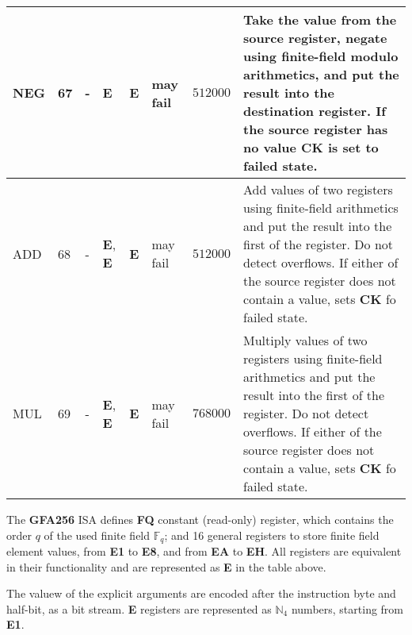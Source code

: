 \documentclass[9pt,oneside]{amsart}
\begin{document}
\begin{table}[h]
\begin{tabular}{l p{1cm} p{1.4cm} p{1cm} p{1cm} p{1.5cm} r p{6cm}}
NEG	&	67	&	-	&	\textbf{E}	&	\textbf{E}	&	may fail	&$512000$	&Take the value from the source register, negate using finite-field modulo arithmetics, and put the result into the destination register. If the source register has no value \textbf{CK} is set to failed state.	\\ \midrule
ADD	&	68	&	-	&	\textbf{E}, \textbf{E}	&	\textbf{E}	&	may fail	&$512000$	&Add values of two registers using finite-field arithmetics and put the result into the first of the register. Do not detect overflows. If either of the source register does not contain a value, sets \textbf{CK} fo failed state.	\\ \midrule
MUL	&	69	&	-	&	\textbf{E}, \textbf{E}	&	\textbf{E}	&	may fail	&$768000$	&Multiply values of two registers using finite-field arithmetics and put the result into the first of the register. Do not detect overflows. If either of the source register does not contain a value, sets \textbf{CK} fo failed state.	\\
\bottomrule
\end{tabular}
\end{table}


The \textbf{GFA256} ISA defines \textbf{FQ} constant (read-only) register,
which contains the order $q$ of the used finite field $\mathbb{F}_q$; and 
16 general registers to store finite field element values,
from \textbf{E1} to \textbf{E8}, and from \textbf{EA} to \textbf{EH}.
All registers are equivalent in their functionality and are represented as \textbf{E} in the table above.

The valuew of the explicit arguments are encoded after the instruction byte and half-bit, as a bit stream.
\textbf{E} registers are represented as $\mathbb{N}_4$ numbers, starting from \textbf{E1}.

\newpage
\end{document}
